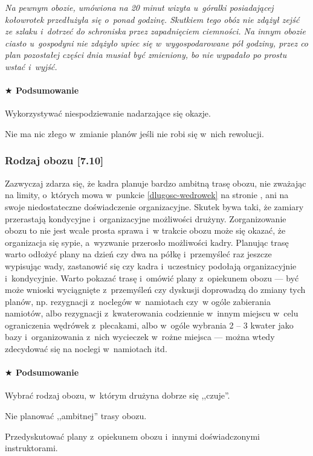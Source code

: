 \documentclass[a5paper,10pt,titlepage,twoside]{article}
\newcommand*{\thecheckbox}{\hss$\Box$} %
\newenvironment*{checklist}
{\list{}{%
\renewcommand*{\makelabel}[1]{\thecheckbox}}}
{\endlist}
\begin{document}
\small{\label{kolowrotek}
\emph{Na pewnym obozie, umówiona na 20 minut wizyta u~góralki posiadającej kołowrotek przedłużyła się o~ponad godzinę. Skutkiem tego obóz nie zdążył zejść ze szlaku i~dotrzeć do schroniska przez zapadnięciem ciemności. Na innym obozie ciasto u~gospodyni nie zdążyło upiec się w~wygospodarowane pół godziny, przez co plan pozostałej części dnia musiał być zmieniony, bo nie wypadało po prostu wstać i~wyjść.}}

\paragraph{$\bigstar$ Podsumowanie}
\begin{checklist}
\item Wykorzystywać niespodziewanie nadarzające się okazje.
\item Nie ma nic złego w~zmianie planów jeśli nie robi się w~nich rewolucji.
\end{checklist}

\subsubsection{Rodzaj obozu [7.10]}
Zazwyczaj zdarza się, że kadra planuje bardzo ambitną trasę obozu, nie zważając na limity, o~których mowa w~punkcie \ref{dlugosc-wedrowek} na stronie \pageref{dlugosc-wedrowek}, ani na swoje niedostateczne doświadczenie organizacyjne. Skutek bywa taki, że zamiary przerastają kondycyjne i~organizacyjne możliwości drużyny. Zorganizowanie obozu to nie jest wcale prosta sprawa i~w trakcie obozu może się okazać, że organizacja się sypie, a~wyzwanie przerosło możliwości kadry. Planując trasę warto odłożyć plany na dzień czy dwa na półkę i~przemyśleć raz jeszcze wypisując wady, zastanowić się czy kadra i~uczestnicy podołają organizacyjnie i~kondycyjnie. Warto pokazać trasę i~omówić plany z~opiekunem obozu --- być może wnioski wyciągnięte z~przemyśleń czy dyskusji doprowadzą do zmiany tych planów, np. rezygnacji z~noclegów w~namiotach czy~w ogóle zabierania namiotów, albo rezygnacji z~kwaterowania codziennie w~innym miejscu w~celu ograniczenia wędrówek z~plecakami, albo w~ogóle wybrania 2 -- 3 kwater jako bazy i~organizowania z~nich wycieczek w~rożne miejsca --- można wtedy zdecydować się na noclegi w~namiotach itd.

\paragraph{$\bigstar$ Podsumowanie}
\begin{checklist}
\item Wybrać rodzaj obozu, w~którym drużyna dobrze się ,,czuje''.
\item Nie planować ,,ambitnej'' trasy obozu.
\item Przedyskutować plany z~opiekunem obozu i~innymi doświadczonymi instruktorami.
\end{checklist}
\end{document}

